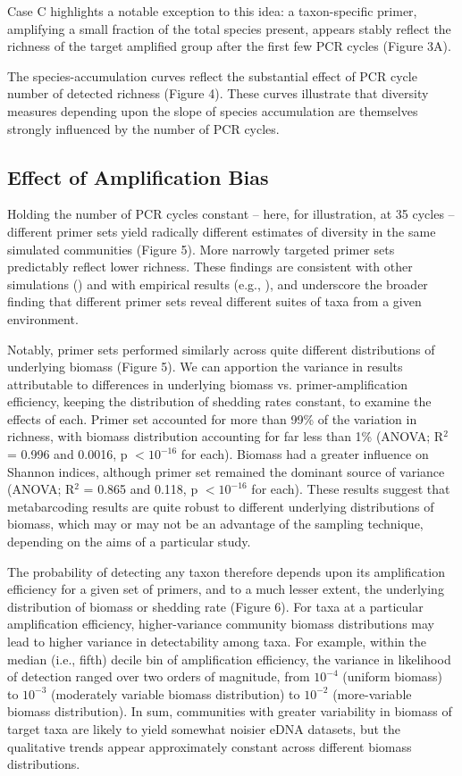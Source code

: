 \documentclass[fleqn,11pt,lineno]{wlscirep}
\begin{document}
Case C highlights a notable exception to this idea: a taxon-specific primer, amplifying a small fraction of the total species present, appears stably reflect the richness of the target amplified group after the first few PCR cycles (Figure 3A).

The species-accumulation curves reflect the substantial effect of PCR cycle number of detected richness (Figure 4). These curves illustrate that diversity measures depending upon the slope of species accumulation are themselves strongly influenced by the number of PCR cycles.

\subsection*{Effect of Amplification Bias}

Holding the number of PCR cycles constant -- here, for illustration, at 35 cycles -- different primer sets yield radically different estimates of diversity in the same simulated communities (Figure 5). More narrowly targeted primer sets predictably reflect lower richness. These findings are consistent with other simulations (\cite{pinol2019choice}) and with empirical results (e.g., \cite{kelly2017multilocus}), and underscore the broader finding that different primer sets reveal different suites of taxa from a given environment. 

Notably, primer sets performed similarly across quite different distributions of underlying biomass (Figure 5). We can apportion the variance in results attributable to differences in underlying biomass vs. primer-amplification efficiency, keeping the distribution of shedding rates constant, to examine the effects of each. Primer set accounted for more than 99\% of the variation in richness, with biomass distribution accounting for far less than 1\% (ANOVA; R$^2$ = 0.996 and 0.0016, p $< 10^{-16}$ for each). Biomass had a greater influence on Shannon indices, although primer set remained the dominant source of variance (ANOVA; R$^2$ = 0.865 and 0.118, p  $< 10^{-16}$ for each).  These results suggest that metabarcoding results are quite robust to different underlying distributions of biomass, which may or may not be an advantage of the sampling technique, depending on the aims of a particular study.

The probability of detecting any taxon therefore depends upon its amplification efficiency for a given set of primers, and to a much lesser extent, the underlying distribution of biomass or shedding rate (Figure 6). For taxa at a particular amplification efficiency, higher-variance community biomass distributions may lead to higher variance in detectability among taxa. For example, within the median (i.e., fifth) decile bin of amplification efficiency, the variance in likelihood of detection ranged over two orders of magnitude, from $10^{-4}$ (uniform biomass) to $10^{-3}$ (moderately variable biomass distribution) to $10^{-2}$ (more-variable biomass distribution). In sum, communities with greater variability in biomass of target taxa are likely to yield somewhat noisier eDNA datasets, but the qualitative trends appear approximately constant across different biomass distributions. 
\end{document}
